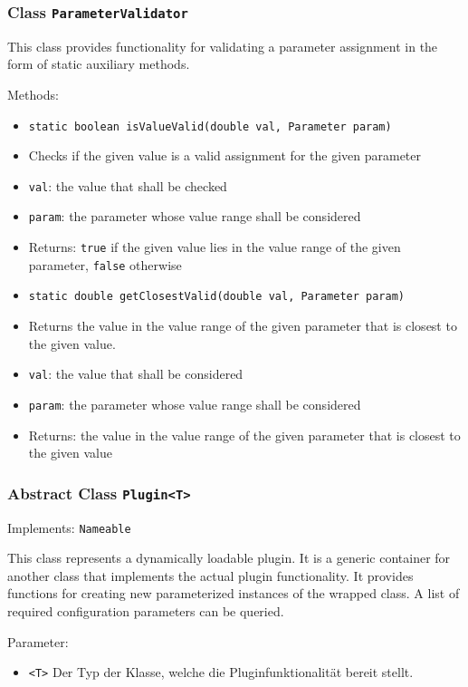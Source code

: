 \documentclass[parskip=full,11pt]{scrartcl}
\begin{document}
\subsubsection{Class \texttt{ParameterValidator}}

This class provides functionality for validating a parameter assignment in the form of static auxiliary methods.

Methods:

\begin{itemize} \itemsep -10pt
	\item \texttt{static boolean isValueValid(double val, Parameter param)}
	\item[] Checks if the given value is a valid assignment for the given parameter
	\item[] \texttt{val}: the value that shall be checked
	\item[] \texttt{param}: the parameter whose value range shall be considered
	\item[] Returns: \texttt{true} if the given value lies in the value range of the given parameter, \texttt{false} otherwise
	\item \texttt{static double getClosestValid(double val, Parameter param)}
	\item[] Returns the value in the value range of the given parameter that is closest to the given value.
	\item[] \texttt{val}: the value that shall be considered
	\item[] \texttt{param}: the parameter whose value range shall be considered
	\item[] Returns: the value in the value range of the given parameter that is closest to the given value
\end{itemize}

\subsubsection{Abstract Class \texttt{Plugin<T>}}
Implements: \texttt{Nameable}

This class represents a dynamically loadable plugin. It is a generic container for another class that implements the actual plugin functionality. It provides functions for creating new parameterized instances of the wrapped class. A list of required configuration parameters can be queried.

Parameter:
\begin{itemize}\itemsep -10pt
	\item \texttt{<T>} Der Typ der Klasse, welche die Pluginfunktionalität bereit stellt.
\end{itemize}
\end{document}
